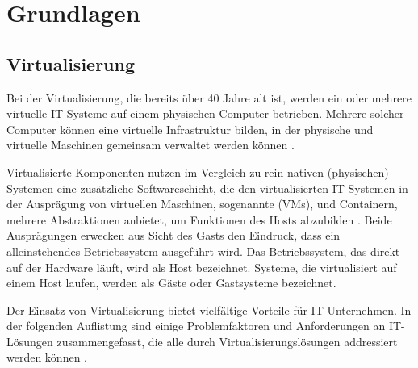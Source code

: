 \documentclass[../main.tex]{subfiles}
\begin{document}
\chapter{Grundlagen}
\label{basics}

	\section{Virtualisierung}
  \label{introVirt}
    Bei der Virtualisierung, die bereits über 40 Jahre alt ist, werden ein oder mehrere virtuelle \acrshort{IT}-Systeme auf einem physischen Computer betrieben. Mehrere solcher Computer können eine virtuelle Infrastruktur bilden, in der physische und virtuelle Maschinen gemeinsam verwaltet werden können \cite[S.661]{tanenbaumOS}.

		Virtualisierte Komponenten nutzen im Vergleich zu rein nativen (physischen) Systemen eine zusätzliche Softwareschicht, die den virtualisierten IT-Systemen in der Ausprägung von virtuellen Maschinen, sogenannte (\acrshort{VM}s), und Containern, mehrere Abstraktionen anbietet, um Funktionen des Hosts abzubilden \cite[S.2]{containerVirtPerformance}. Beide Ausprägungen erwecken aus Sicht des Gasts den Eindruck, dass ein alleinstehendes Betriebssystem ausgeführt wird. Das Betriebssystem, das direkt auf der Hardware läuft, wird als Host bezeichnet. Systeme, die virtualisiert auf einem Host laufen, werden als Gäste oder Gastsysteme bezeichnet.

    Der Einsatz von Virtualisierung bietet vielfältige Vorteile für \acrshort{IT}-Unternehmen. In der folgenden Auflistung sind einige Problemfaktoren und Anforderungen an IT-Lösungen zusammengefasst, die alle durch Virtualisierungslösungen addressiert werden können \cite[S.1]{bsiVirt}\cite[S.662]{tanenbaumOS}.
\end{document}
